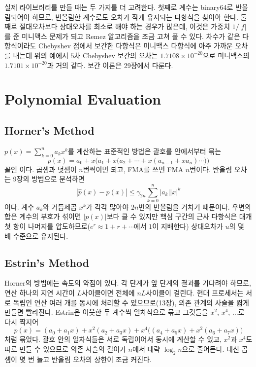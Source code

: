 실제 라이브러리를 만들 때는 두 가지를 더 고려한다. 첫째로 계수는 binary64로 반올림되어야 하므로, 반올림한 계수로도 오차가 작게 유지되는 다항식을 찾아야 한다. 둘째로 절대오차보다 상대오차를 최소로 해야 하는 경우가 많은데, 이것은 가중치 $1/|f|$를 준 미니맥스 문제가 되고 Remez 알고리즘을 조금 고쳐 풀 수 있다. 차수가 같은 다항식이라도 Chebyshev 점에서 보간한 다항식은 미니맥스 다항식에 아주 가까운 오차를 내는데 위의 예에서 $5$차 Chebyshev 보간의 오차는 $1.7108\times10^{-20}$으로 미니맥스의 $1.7101\times10^{-20}$과 거의 같다. 보간 이론은 29장에서 다룬다.

\section{Polynomial Evaluation}
\label{sec:poly-eval}

\subsection{Horner's Method}

$p(x)=\sum_{k=0}^na_kx^k$를 계산하는 표준적인 방법은 괄호를 안에서부터 묶는
\[
p(x)=a_0+x\bigl(a_1+x\bigl(a_2+\cdots+x(a_{n-1}+xa_n)\cdots\bigr)\bigr)
\]
꼴인 이다. 곱셈과 덧셈이 $n$번씩이면 되고, FMA를 쓰면 FMA $n$번이다. 반올림 오차는 9장의 방법으로 분석하면
\[
|\hat p(x)-p(x)|\le\gamma_{2n}\sum_{k=0}^n|a_k||x|^k
\]
이다. 계수 $a_k$와 거듭제곱 $x^k$가 각각 많아야 $2n$번의 반올림을 거치기 때문이다. 우변의 합은 계수의 부호가 섞이면 $|p(x)|$보다 클 수 있지만 핵심 구간의 근사 다항식은 대개 첫 항이 나머지를 압도하므로($e^r\approx1+r+\cdots$에서 $1$이 지배한다) 상대오차가 $u$의 몇 배 수준으로 유지된다.

\subsection{Estrin's Method}

Horner의 방법에는 속도의 약점이 있다. 각 단계가 앞 단계의 결과를 기다려야 하므로, 연산 하나의 지연 시간이 $L$사이클이면 전체에 $nL$사이클이 걸린다. 현대 프로세서는 서로 독립인 연산 여러 개를 동시에 처리할 수 있으므로(13장), 의존 관계의 사슬을 짧게 만들면 빨라진다. Estrin은 이웃한 두 계수씩 일차식으로 묶고 그것들을 $x^2$, $x^4$, $\dots$로 다시 짝지어
\[
p(x)=(a_0+a_1x)+x^2(a_2+a_3x)+x^4\bigl((a_4+a_5x)+x^2(a_6+a_7x)\bigr)
\]
처럼 묶었다\cite{estrin1960}. 괄호 안의 일차식들은 서로 독립이어서 동시에 계산할 수 있고, $x^2$과 $x^4$도 따로 만들 수 있으므로 의존 사슬의 길이가 $n$에서 대략 $\log_2n$으로 줄어든다. 대신 곱셈이 몇 번 늘고 반올림 오차의 상한이 조금 커진다.

